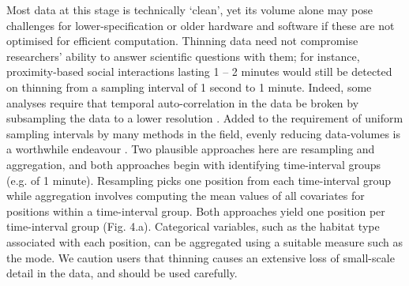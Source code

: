 \documentclass[10pt,paper=a4,headings=standardclasses
]{scrartcl}
\begin{document}
Most data at this stage is technically ‘clean’, yet its volume alone may pose challenges for lower-specification or older hardware and software if these are not optimised for efficient computation.
Thinning data need not compromise researchers' ability to answer scientific questions with them; for instance, proximity-based social interactions lasting 1 -- 2 minutes would still be detected on thinning from a sampling interval of 1 second to 1 minute.
Indeed, some analyses require that temporal auto-correlation in the data be broken by subsampling the data to a lower resolution \citep[such as the estimation of home-ranges or step-selection functions;][]{fleming2014a, dupke2017}.
Added to the requirement of uniform sampling intervals by many methods in the field, evenly reducing data-volumes is a worthwhile endeavour \citep[e.g.][]{fleming2014a, michelot2016, avgar2016}.
Two plausible approaches here are resampling and aggregation, and both approaches begin with identifying time-interval groups (e.g. of 1 minute).
Resampling picks one position from each time-interval group while aggregation involves computing the mean values of all covariates for positions within a time-interval group.
Both approaches yield one position per time-interval group (Fig. 4.a).
Categorical variables, such as the habitat type associated with each position, can be aggregated using a suitable measure such as the mode.
We caution users that thinning causes an extensive loss of small-scale detail in the data, and should be used carefully.
\end{document}
